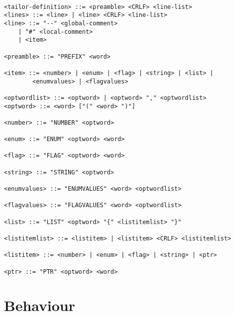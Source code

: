 \begin {verbatim}

<tailor-definition> ::= <preamble> <CRLF> <line-list>
<lines> ::= <line> | <line> <CRLF> <line-list>
<line> ::= "--" <global-comment> 
	| "#" <local-comment>
	| <item>

<preamble> ::= "PREFIX" <word>

<item> ::= <number> | <enum> | <flag> | <string> | <list> |
		<enumvalues> | <flagvalues>

<optwordlist> ::= <optword> | <optword> "," <optwordlist>
<optword> ::= <word> ["(" <word> ")"]		

<number> ::= "NUMBER" <optword>

<enum> ::= "ENUM" <optword> <word>

<flag> ::= "FLAG" <optword> <word>

<string> ::= "STRING" <optword>

<enumvalues> ::= "ENUMVALUES" <word> <optwordlist>

<flagvalues> ::= "FLAGVALUES" <word> <optwordlist>

<list> ::= "LIST" <optword> "{" <listitemlist> "}"

<listitemlist> ::= <listitem> | <listitem> <CRLF> <listitemlist>

<listitem> ::= <number> | <enum> | <flag> | <string> | <ptr>

<ptr> ::= "PTR" <optword> <word>
\end{verbatim}

\section {Behaviour}


